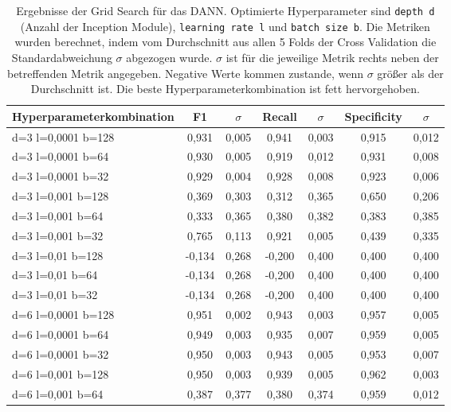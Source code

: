 \begin{table}[h!]
\centering
\caption[Hyperparameteroptimierung des DANNs]{Ergebnisse der Grid Search für das \gls{DANN}. Optimierte Hyperparameter sind \texttt{depth d} (Anzahl der Inception Module), \texttt{learning rate l} und \texttt{batch size b}. Die Metriken wurden berechnet, indem vom Durchschnitt aus allen 5 Folds der Cross Validation die Standardabweichung $\sigma$ abgezogen wurde. $\sigma$ ist für die jeweilige Metrik rechts neben der betreffenden Metrik angegeben. Negative Werte kommen zustande, wenn $\sigma$ größer als der Durchschnitt ist. Die beste Hyperparameterkombination ist fett hervorgehoben. }
\label{tab:GridSearch_DANN}
\begin{tabular}{lcccccc}
\toprule
\textbf{Hyperparameterkombination} & \textbf{F1} & \textbf{$\sigma$} & \textbf{Recall} & \textbf{$\sigma$} & \textbf{Specificity} & \textbf{$\sigma$}\\
\midrule 
d=3 l=0,0001 b=128  & 0,931  & 0,005  & 0,941  & 0,003 & 0,915 & 0,012 \\
d=3 l=0,0001 b=64  & 0,930  & 0,005  & 0,919  & 0,012 & 0,931 & 0,008 \\
d=3 l=0,0001 b=32  & 0,929  & 0,004  & 0,928  & 0,008 & 0,923 & 0,006 \\
d=3 l=0,001	b=128  & 0,369  & 0,303  & 0,312  & 0,365 & 0,650 & 0,206 \\
d=3 l=0,001	b=64  & 0,333  & 0,365  & 0,380  & 0,382 & 0,383 & 0,385 \\
d=3 l=0,001	b=32  & 0,765  & 0,113  & 0,921  & 0,005 & 0,439 & 0,335 \\
d=3 l=0,01 b=128  & -0,134  & 0,268  & -0,200  & 0,400 & 0,400 & 0,400 \\
d=3 l=0,01 b=64  & -0,134  & 0,268  & -0,200  & 0,400 & 0,400 & 0,400 \\
d=3 l=0,01 b=32  & -0,134  & 0,268  & -0,200  & 0,400 & 0,400 & 0,400 \\
d=6 l=0,0001 b=128  & 0,951  & 0,002  & 0,943  & 0,003 & 0,957 & 0,005 \\
d=6 l=0,0001 b=64  & 0,949  & 0,003  & 0,935  & 0,007 & 0,959 & 0,005 \\
d=6 l=0,0001 b=32  & 0,950  & 0,003  & 0,943  & 0,005 & 0,953 & 0,007 \\
d=6 l=0,001 b=128  & 0,950  & 0,003  & 0,939  & 0,005 & 0,962 & 0,003 \\
d=6 l=0,001 b=64  & 0,387  & 0,377  & 0,380  & 0,374 & 0,959 & 0,012 \\

\end{tabular}
\end{table}
